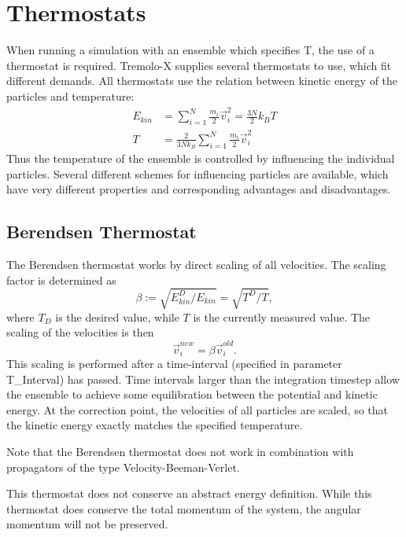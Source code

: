 
\section{Thermostats}
\label{thermostats}

When running a simulation with an ensemble which specifies T, the use of a thermostat is required. Tremolo-X supplies several thermostats to use, which fit different demands.
All thermostats use the relation between kinetic energy of the particles and temperature:
\begin{align*}
E_{kin} & = \sum_{i=1}^N \frac{m_i}{2}\vec{v}_i^2=\frac{3N}{2}k_BT\\
T & = \frac{2}{3Nk_B} \sum_{i=1}^N\frac{m_i}{2}\vec{v}_i^2
\end{align*}
Thus the temperature of the ensemble is controlled by influencing the individual particles. Several different schemes for influencing particles are available, which have very different properties and corresponding advantages and disadvantages.

\subsection{Berendsen Thermostat}
The Berendsen thermostat works by direct scaling of all velocities. The scaling factor is determined as
\begin{equation*}
\beta:=\sqrt{E_{kin}^D/E_{kin}}=\sqrt{T^D/T},
\end{equation*}
where $T_D$ is the desired value, while $T$ is the currently measured value. The scaling of the velocities is then
\begin{equation*}
\vec{v}_i^{new}=\beta\vec{v}_i^{old}.
\end{equation*}
This scaling is performed after a time-interval (specified in parameter T\_Interval) has passed. Time intervals larger than the integration timestep allow the ensemble to achieve some equilibration between the potential and kinetic energy. At the correction point, the velocities of all particles are scaled, so that the kinetic energy exactly matches the specified temperature.

Note that the Berendsen thermostat does not work in combination with propagators of the type Velocity-Beeman-Verlet.

This thermostat does not conserve an abstract energy definition.
While this thermostat does conserve the total momentum of the system, the angular momentum will not be preserved.

